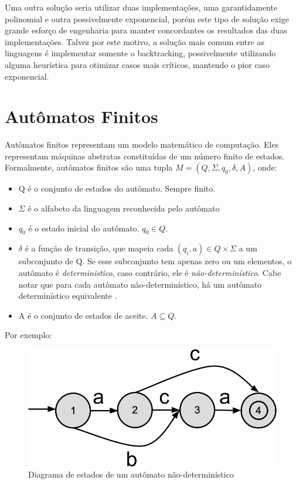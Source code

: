 \documentclass[a4paper,12pt,oneside,onecolumn]{uerj}
\begin{document}
Uma outra solução seria utilizar duas implementações, uma garantidamente polinomial e outra possivelmente exponencial, porém este tipo de solução exige grande esforço de engenharia para manter concordantes os resultados das duas implementações. Talvez por este motivo, a solução mais comum entre as linguagens é implementar somente o backtracking, possivelmente utilizando alguma heurística para otimizar casos mais críticos, mantendo o pior caso exponencial.

\section{Autômatos Finitos}

Autômatos finitos representam um modelo matemático de computação. Eles representam máquinas abstratas constituídas de um número finito de estados. Formalmente, autômatos finitos são uma tupla $M = (Q, \Sigma, q_0, \delta, A)$, onde:

\begin{itemize}
    \item Q é o conjunto de estados do autômato. Sempre finito.
    \item $\Sigma$ é o alfabeto da linguagem reconhecida pelo autômato
    \item $q_0$ é o estado inicial do autômato. $q_0 \in Q$.
    \item $\delta$ é a função de transição, que mapeia cada $(q_i, a) \in Q \times \Sigma$ a um subconjunto de Q. Se esse subconjunto tem apenas zero ou um elementos, o autômato é \emph{deterministico}, caso contrário, ele é \emph{não-determinístico}. Cabe notar que para cada autômato não-determinístico, há um autômato determinístico equivalente \cite{bib:Rabin59}.
    \item A é o conjunto de estados de aceite. $A \subseteq Q$.
\end{itemize}

Por exemplo:

\begin{figure}[!htbp]
  \centering
  \includegraphics[scale=0.3]{figures/exemplo_automato_numerado.png}
  \caption{Diagrama de estados de um autômato não-determinístico}
  \label{fig:exemplo_automato_numerado}
\end{figure}
\end{document}
